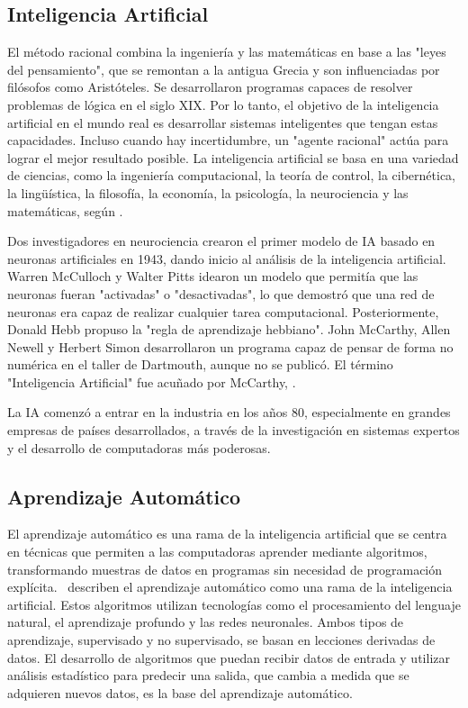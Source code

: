\subsection{Inteligencia Artificial}

El método racional combina la ingeniería y las matemáticas en base a las "leyes del pensamiento", que se remontan a la antigua Grecia y son influenciadas por filósofos como Aristóteles. Se desarrollaron programas capaces de resolver problemas de lógica en el siglo XIX. Por lo tanto, el objetivo de la inteligencia artificial en el mundo real es desarrollar sistemas inteligentes que tengan estas capacidades. Incluso cuando hay incertidumbre, un "agente racional" actúa para lograr el mejor resultado posible. La inteligencia artificial se basa en una variedad de ciencias, como la ingeniería computacional, la teoría de control, la cibernética, la lingüística, la filosofía, la economía, la psicología, la neurociencia y las matemáticas, según \parencite{bk_russell2004intart}.

Dos investigadores en neurociencia crearon el primer modelo de IA basado en neuronas artificiales en 1943, dando inicio al análisis de la inteligencia artificial. Warren McCulloch y Walter Pitts idearon un modelo que permitía que las neuronas fueran "activadas" o "desactivadas", lo que demostró que una red de neuronas era capaz de realizar cualquier tarea computacional. Posteriormente, Donald Hebb propuso la "regla de aprendizaje hebbiano". John McCarthy, Allen Newell y Herbert Simon desarrollaron un programa capaz de pensar de forma no numérica en el taller de Dartmouth, aunque no se publicó. El término "Inteligencia Artificial" fue acuñado por McCarthy, \parencite{bk_russell2004intart}.

La IA comenzó a entrar en la industria en los años 80, especialmente en grandes empresas de países desarrollados, a través de la investigación en sistemas expertos y el desarrollo de computadoras más poderosas.

\subsection{Aprendizaje Automático}
El aprendizaje automático es una rama de la inteligencia artificial que se centra en técnicas que permiten a las computadoras aprender mediante algoritmos, transformando muestras de datos en programas sin necesidad de programación explícita. \parencite{bk_russell2009intart} describen el aprendizaje automático como una rama de la inteligencia artificial. Estos algoritmos utilizan tecnologías como el procesamiento del lenguaje natural, el aprendizaje profundo y las redes neuronales. Ambos tipos de aprendizaje, supervisado y no supervisado, se basan en lecciones derivadas de datos. El desarrollo de algoritmos que puedan recibir datos de entrada y utilizar análisis estadístico para predecir una salida, que cambia a medida que se adquieren nuevos datos, es la base del aprendizaje automático. \parencite{bk_alpaydin2014ml}


